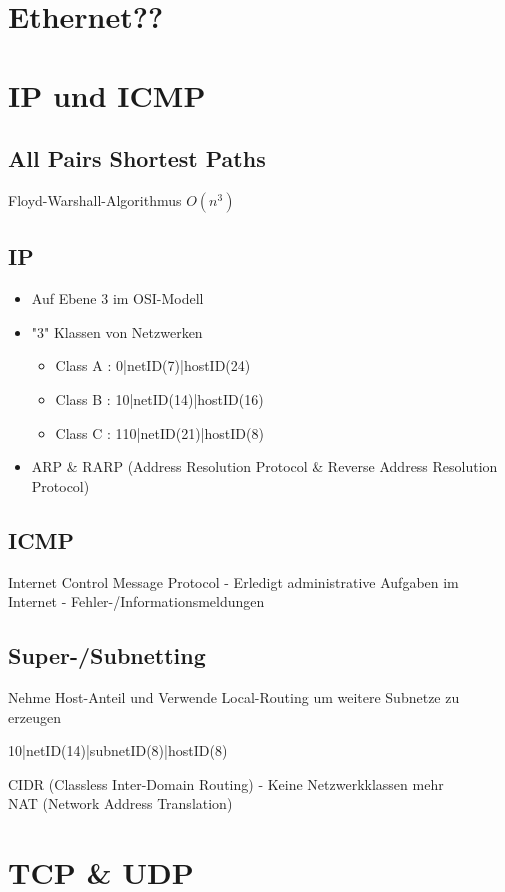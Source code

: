 \documentclass[10pt,a4paper]{article}
\begin{document}
\section{Ethernet??}

\section{IP und ICMP}
	\subsection{All Pairs Shortest Paths}
		Floyd-Warshall-Algorithmus $O(n^{3})$
		
	\subsection{IP}
		\begin{itemize}
			\item Auf Ebene 3 im OSI-Modell
			\item "3" Klassen von Netzwerken
			\begin{itemize}
				\item Class A : 0|netID(7)|hostID(24)
				\item Class B : 10|netID(14)|hostID(16)
				\item Class C : 110|netID(21)|hostID(8)
			\end{itemize}
			\item ARP \& RARP (Address Resolution Protocol \& Reverse Address Resolution Protocol)
		\end{itemize}
	\subsection{ICMP}
		Internet Control Message Protocol - Erledigt administrative Aufgaben im Internet - Fehler-/Informationsmeldungen 
	\subsection{Super-/Subnetting}
		Nehme Host-Anteil und  Verwende Local-Routing um weitere Subnetze zu erzeugen
		\begin{center}
			10|netID(14)|subnetID(8)|hostID(8)
		\end{center}
		CIDR (Classless Inter-Domain Routing) - Keine Netzwerkklassen mehr	\\
		NAT (Network Address Translation)
		
\section{TCP \& UDP}
\end{document}
